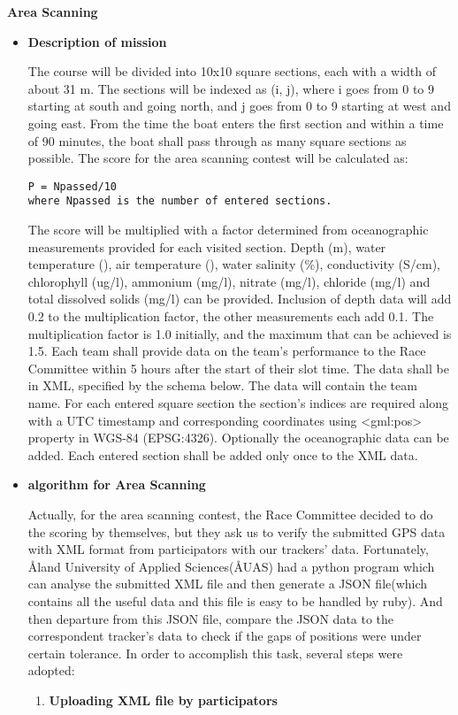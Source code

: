 \item{\textbf{Area Scanning}}


\begin{itemize}
\item{\textbf{Description of mission}}


The course will be divided into 10x10 square sections, each with a width of about 31 m. The sections will be indexed as (i, j), where i goes from 0 to 9 starting at south and going north, and j goes from 0 to 9 starting at west and going east. From the time the boat enters the first section and within a time of 90 minutes, the boat shall pass through as many square sections as possible. The score for the area scanning contest will be calculated as:
\begin{lstlisting}
P = Npassed/10
where Npassed is the number of entered sections.
\end{lstlisting}
The score will be multiplied with a factor determined from oceanographic measurements provided for each visited section. Depth (m), water temperature (\textcelsius), air temperature (\textcelsius), water salinity (\%), conductivity (S/cm), chlorophyll (ug/l), ammonium (mg/l), nitrate (mg/l), chloride (mg/l) and total dissolved solids (mg/l) can be provided. Inclusion of depth data will add 0.2 to the multiplication factor, the other measurements each add 0.1. The multiplication factor is 1.0 initially, and the maximum that can be achieved is 1.5. Each team shall provide data on the team’s performance to the Race Committee within 5 hours after the start of their slot time. The data shall be in XML, specified by the schema below. The data will contain the team name. For each entered square section the section’s indices are required along with a UTC timestamp and corresponding coordinates using <gml:pos> property in WGS-84 (EPSG:4326). Optionally the oceanographic data can be added. Each entered section shall be added only once to the XML data.
\item{\textbf{algorithm for Area Scanning}}


Actually, for the area scanning contest, the Race Committee decided to do the scoring by themselves, but they ask us to verify the submitted GPS data with XML format from participators with our trackers' data. Fortunately, Åland University of Applied Sciences(ÅUAS) had a python program which can analyse the submitted XML file and then generate a JSON file(which contains all the useful data and this file is easy to be handled by ruby). And then departure from this JSON file, compare the JSON data to the correspondent tracker's data to check if the gaps of positions were under certain tolerance. In order to accomplish this task, several steps were adopted:
\begin{enumerate}
\item{\textbf{Uploading XML file by participators}}



\end{enumerate}
\end{itemize}
